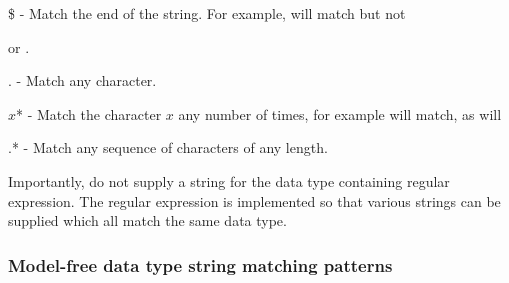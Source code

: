     \$ - Match the end of the string.  For example, 
 will match 
 but not 

    or 
.

    . - Match any character.

    $x$* - Match the character $x$ any number of times, for example 
 will match, as will
    


    .* - Match any sequence of characters of any length.

Importantly, do not supply a string for the data type containing regular expression.  The
regular expression is implemented so that various strings can be supplied which all match
the same data type.


\subsubsection{Model-free data type string matching patterns}



